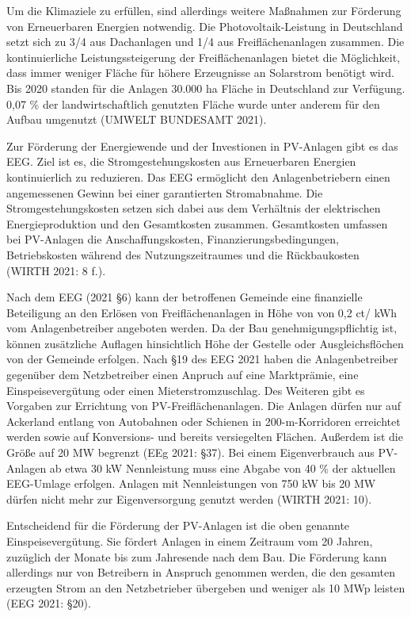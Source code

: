 \documentclass[11pt]{scrartcl}
\begin{document}
Um die Klimaziele zu erfüllen, sind allerdings weitere Maßnahmen zur Förderung von Erneuerbaren Energien notwendig.
Die Photovoltaik-Leistung in Deutschland setzt sich zu 3/4 aus Dachanlagen und 1/4 aus Freiflächenanlagen zusammen.
Die kontinuierliche Leistungssteigerung der Freiflächenanlagen bietet die Möglichkeit, dass immer weniger Fläche für höhere Erzeugnisse an Solarstrom benötigt wird.
Bis 2020 standen für die Anlagen 30.000 ha Fläche in Deutschland zur Verfügung.
0,07 \% der landwirtschaftlich genutzten Fläche wurde unter anderem für den Aufbau umgenutzt (UMWELT BUNDESAMT 2021).

Zur Förderung der Energiewende und der Investionen in PV-Anlagen gibt es das \ac{EEG}.
Ziel ist es, die Stromgestehungskosten aus Erneuerbaren Energien kontinuierlich zu reduzieren.
Das \ac{EEG} ermöglicht den Anlagenbetriebern einen angemessenen Gewinn bei einer garantierten Stromabnahme.
Die Stromgestehungskosten setzen sich dabei aus dem Verhältnis der elektrischen Energieproduktion und den Gesamtkosten zusammen.
Gesamtkosten umfassen bei PV-Anlagen die Anschaffungskosten, Finanzierungsbedingungen, Betriebskosten während des Nutzungszeitraumes und die Rückbaukosten (WIRTH 2021: 8 f.).

Nach dem \ac{EEG} (2021 §6) kann der betroffenen Gemeinde eine finanzielle Beteiligung an den Erlösen von Freiflächenanlagen in Höhe von von 0,2 ct/ kWh vom Anlagenbetreiber angeboten werden.
Da der Bau genehmigungspflichtig ist, können zusätzliche Auflagen hinsichtlich Höhe der Gestelle oder Ausgleichsflöchen von der Gemeinde erfolgen.
Nach §19 des \ac{EEG} 2021 haben die Anlagenbetreiber gegenüber dem Netzbetreiber einen Anpruch auf eine Marktprämie, eine Einspeisevergütung oder einen Mieterstromzuschlag.
Des Weiteren gibt es Vorgaben zur Errichtung von PV-Freiflächenanlagen.
Die Anlagen dürfen nur auf Ackerland entlang von Autobahnen oder Schienen in 200-m-Korridoren erreichtet werden sowie auf Konversions- und bereits versiegelten Flächen.
Außerdem ist die Größe auf 20 MW begrenzt (EEg 2021: §37).
Bei einem Eigenverbrauch aus PV-Anlagen ab etwa 30 kW Nennleistung muss eine Abgabe von 40 \% der aktuellen \ac{EEG}-Umlage erfolgen.
Anlagen mit Nennleistungen von 750 kW bis 20 MW dürfen nicht mehr zur Eigenversorgung genutzt werden (WIRTH 2021: 10).

Entscheidend für die Förderung der PV-Anlagen ist die oben genannte Einspeisevergütung.
Sie fördert Anlagen in einem Zeitraum vom 20 Jahren, zuzüglich der Monate bis zum Jahresende nach dem Bau.
Die Förderung kann allerdings nur von Betreibern in Anspruch genommen werden, die den gesamten erzeugten Strom an den Netzbetrieber übergeben und weniger als 10 MWp leisten (EEG 2021: §20).
\end{document}
